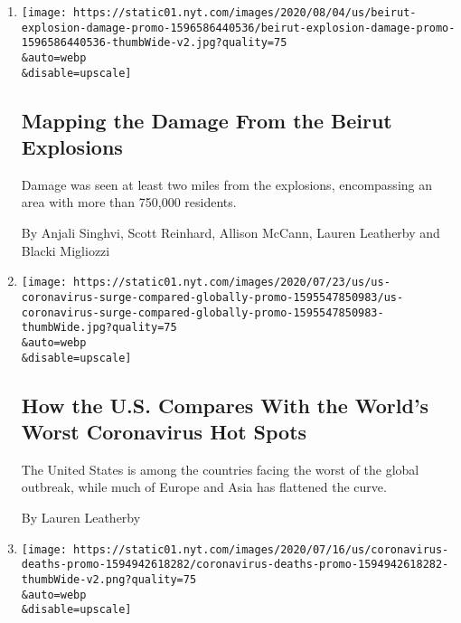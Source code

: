 \begin{enumerate}
\def\labelenumi{\arabic{enumi}.}
\item
  \href{/interactive/2020/08/04/world/middleeast/beirut-explosion-damage.html}{}

  \texttt{[image: https://static01.nyt.com/images/2020/08/04/us/beirut-explosion-damage-promo-1596586440536/beirut-explosion-damage-promo-1596586440536-thumbWide-v2.jpg?quality=75\\\&auto=webp\\\&disable=upscale]}

  \hypertarget{mapping-the-damage-from-the-beirut-explosions}{%
  \subsection{Mapping the Damage From the Beirut
  Explosions}\label{mapping-the-damage-from-the-beirut-explosions}}

  Damage was seen at least two miles from the explosions, encompassing
  an area with more than 750,000 residents.

  By Anjali Singhvi, Scott Reinhard, Allison McCann, Lauren Leatherby
  and Blacki Migliozzi
\item
  \href{/interactive/2020/07/23/us/coronavirus-hotspots-countries.html}{}

  \texttt{[image: https://static01.nyt.com/images/2020/07/23/us/us-coronavirus-surge-compared-globally-promo-1595547850983/us-coronavirus-surge-compared-globally-promo-1595547850983-thumbWide.jpg?quality=75\\\&auto=webp\\\&disable=upscale]}

  \hypertarget{how-the-us-compares-with-the-worlds-worst-coronavirus-hot-spots}{%
  \subsection{How the U.S. Compares With the World's Worst Coronavirus
  Hot
  Spots}\label{how-the-us-compares-with-the-worlds-worst-coronavirus-hot-spots}}

  The United States is among the countries facing the worst of the
  global outbreak, while much of Europe and Asia has flattened the
  curve.

  By Lauren Leatherby
\item
  \href{/interactive/2020/07/17/us/coronavirus-deaths.html}{}

  \texttt{[image: https://static01.nyt.com/images/2020/07/16/us/coronavirus-deaths-promo-1594942618282/coronavirus-deaths-promo-1594942618282-thumbWide-v2.png?quality=75\\\&auto=webp\\\&disable=upscale]}


\end{enumerate}
